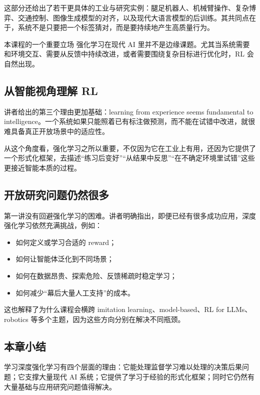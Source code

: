 \documentclass[a4paper]{article}
\begin{document}
这部分还给出了若干更具体的工业与研究实例：腿足机器人、机械臂操作、复杂博弈、交通控制、图像生成模型的对齐，以及现代大语言模型的后训练。其共同点在于，系统不是只要把一个标签猜对，而是要持续地产生高质量行为。

\begin{importantbox}{本课程的一个重要立场}
强化学习在现代 AI 里并不是边缘课题。尤其当系统需要和环境交互、需要从反馈中持续改进，或者需要围绕复杂目标进行优化时，RL 会自然出现。
\end{importantbox}

\subsection{从智能视角理解 RL}

讲者给出的第三个理由更加基础：learning from experience seems fundamental to intelligence。一个系统如果只能照着已有标注做预测，而不能在试错中改进，就很难具备真正开放场景中的适应性。

从这个角度看，强化学习之所以重要，不仅因为它在工业上有用，还因为它提供了一个形式化框架，去描述“练习后变好”“从结果中反思”“在不确定环境里试错”这些更接近智能本质的过程。

\subsection{开放研究问题仍然很多}

第一讲没有回避强化学习的困难。讲者明确指出，即便已经有很多成功应用，深度强化学习依然充满挑战，例如：
\begin{itemize}
\item 如何定义或学习合适的 reward；
\item 如何让智能体泛化到不同场景；
\item 如何在数据昂贵、探索危险、反馈稀疏时稳定学习；
\item 如何减少“幕后大量人工支持”的成本。
\end{itemize}

这也解释了为什么课程会横跨 imitation learning、model-based、RL for LLMs、robotics 等多个主题，因为这些方向分别在解决不同瓶颈。

\subsection{本章小结}

学习深度强化学习有四个层面的理由：它能处理监督学习难以处理的决策后果问题；它支撑大量现代 AI 系统；它提供了学习于经验的形式化框架；同时它仍然有大量基础与应用研究问题值得解决。
\end{document}
